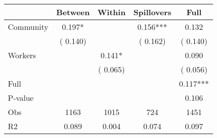 
\begin{tabular}{l*{4}{c}}\hline&\multicolumn{1}{c}{Between}&\multicolumn{1}{c}{Within}&\multicolumn{1}{c}{Spillovers}&\multicolumn{1}{c}{Full}\\ \hline
 Community             &              0.197*      &                                               &        0.156*** &         0.132                            \\ 
                               &        (       0.140)           &                                       &       (       0.162)     &      (       0.140)                                           \\ 
 Workers       &                                               &        0.141*    &                                &             0.090                            \\ 
                               &                                               & (       0.065)                  &                                        &      (       0.056)                                           \\ 
\hline                                                                                                                                                                                                                                            
 Full                  &                                               &                                               &                                        &             0.117***                                     \\ 
 P-value               &                                               &                                               &                                        &             0.106                                           \\ 
 Obs                   &               1163               &       1015                       &       724                &              1451                                               \\ 
 R2                    &                      0.089              &              0.004                      &              0.074               &                     0.097                                              \\ 
\hline \end{tabular}                                                                                                                                                                                                              